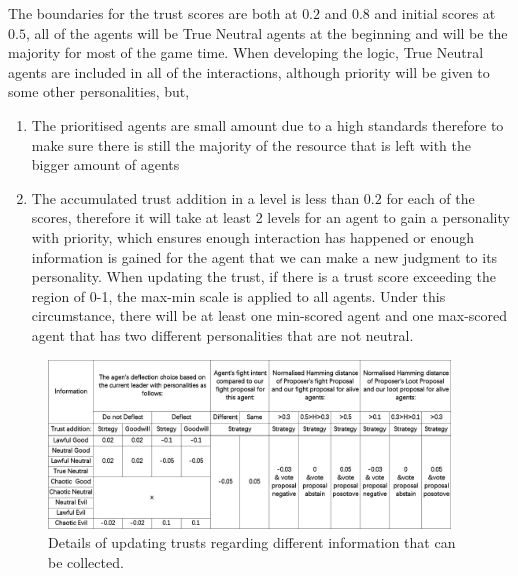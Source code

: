 The boundaries for the trust scores are both at $0.2$ and $0.8$ and initial scores at $0.5$, all of the agents will be True Neutral agents at the beginning and will be the majority for most of the game time. When developing the logic, True Neutral agents are included in all of the interactions, although priority will be given to some other personalities, but,
\begin{enumerate}
    \item The prioritised agents are small amount due to a high standards therefore to make sure there is still the majority of the resource that is left with the bigger amount of agents
    \item The accumulated trust addition in a level is less than $0.2$ for each of the scores, therefore it will take at least 2 levels for an agent to gain a personality with priority, which ensures enough interaction has happened or enough information is gained for the agent that we can make a new judgment to its personality. When updating the trust, if there is a trust score exceeding the region of 0-1, the max-min scale is applied to all agents. Under this circumstance, there will be at least one min-scored agent and one max-scored agent that has two different personalities that are not neutral.
\end{enumerate}

\begin{figure}[htb]
    \centering
    \includegraphics[width=0.95\textwidth]{008_team_5_agent_design/images/Information2Trusts-sideway.png}
    \caption{Details of updating trusts regarding different information that can be collected.}
    \label{fig:Information2Trusts}
\end{figure}

